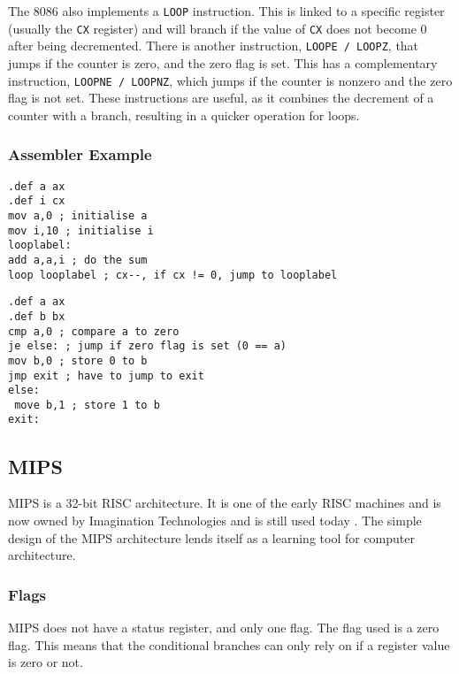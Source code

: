 \documentclass[12pt,a4paper]{article}
\begin{document}
\begin{bibunit}[is-unsrt]
The 8086 also implements a \texttt{LOOP} instruction.
This is linked to a specific register (usually the \texttt{CX} register) and will branch if the value of \texttt{CX} does not become $0$ after being decremented.
There is another instruction, \texttt{LOOPE / LOOPZ}, that jumps if the counter is zero, and the zero flag is set. 
This has a complementary instruction, \texttt{LOOPNE / LOOPNZ}, which jumps if the counter is nonzero and the zero flag is not set.
These instructions are useful, as it combines the decrement of a counter with a branch, resulting in a quicker operation for loops.

\subsubsection{Assembler Example}
\begin{lstlisting}[frame=single,caption=Intel 8086 assembler for listing \ref{ListC},label=intel1]
.def a ax
.def i cx
mov a,0 ; initialise a
mov i,10 ; initialise i
looplabel: 
add a,a,i ; do the sum
loop looplabel ; cx--, if cx != 0, jump to looplabel
\end{lstlisting}

\begin{lstlisting}[frame=single,caption=Intel 8086 assembler for listing \ref{ListC2},label=intel2]
.def a ax
.def b bx
cmp a,0 ; compare a to zero
je else: ; jump if zero flag is set (0 == a)
mov b,0 ; store 0 to b
jmp exit ; have to jump to exit
else:
 move b,1 ; store 1 to b
exit:

\end{lstlisting}

\subsection{MIPS}

MIPS is a 32-bit RISC architecture.
It is one of the early RISC machines and is now owned by Imagination Technologies and is still used today \cite{mips:wiki}.
The simple design of the MIPS architecture lends itself as a learning tool for computer architecture.

\subsubsection{Flags}

MIPS does not have a status register, and only one flag.
The flag used is a zero flag. 
This means that the conditional branches can only rely on if a register value is zero or not.



\end{bibunit}
\end{document}
